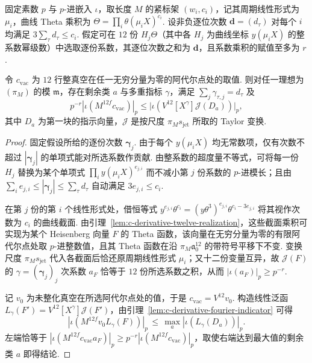 \begin{lemma}[曲线级数系数向剩余类指示向量的传递]
\label{lem:c-derivative-indicator}
\emitthmsource
固定素数 $p$ 与 $p$-进嵌入 $\iota$，取长度 $M$ 的紧标架 $(w_i,c_i)$，记其周期线性形式为 $\mu_i$，曲线 Theta 乘积为 $\Theta=\prod_i\theta(\mu_i X)^{c_i}$. 设非负逐位次数 $\boldsymbol d=(d_\tau)$ 对每个 $i$ 均满足 $3\sum_\tau d_\tau\le c_i$. 假定可在 $12$ 份 $H_j\Theta$（其中各 $H_j$ 为曲线坐标 $y(\mu_i X)$ 的整系数幂级数）中选取逐份系数，其逐位次数之和为 $\boldsymbol d$，且系数乘积的赋值至多为 $r$.

令 $c_{\mathrm{vac}}$ 为 $12$ 行整真空在任一无穷分量为零的阿代尔点处的取值. 则对任一理想为 $(\pi_M)$ 的模 $\mathfrak m$，存在剩余类 $a$ 与多重指标 $\gamma$，满足 $\sum_j\gamma_{\tau,j}=d_\tau$ 及
\[
  p^{-r}|\iota(M^{12f}c_{\mathrm{vac}})|_p
      \le \bigl|\iota(V^{12}[X^\gamma]\mathcal J(D_a))\bigr|_p ,
\]
其中 $D_a$ 为第一块的指示向量，$\mathcal J$ 是按尺度 $\pi_M s_{\mathrm{jet}}$ 所取的 Taylor 变换.
\end{lemma}

\begin{proof}
固定假设所给的逐份次数 $\boldsymbol\gamma_j$. 由于每个 $y(\mu_i X)$ 均无常数项，仅有次数不超过 $|\boldsymbol\gamma_j|$ 的单项式能对所选系数作贡献. 由整系数的超度量不等式，可将每一份 $H_j$ 替换为某个单项式 $\prod_i y(\mu_i X)^{e_{j,i}}$ 而不减小第 $j$ 份系数的 $p$-进模长；且由 $\sum_i e_{j,i}\le|\boldsymbol\gamma_j|\le\sum_\tau d_\tau$ 自动满足 $3e_{j,i}\le c_i$.

在第 $j$ 份的第 $i$ 个线性形式处，借恒等式 $y^{e_{j,i}}\theta^{c_i}=(y\theta^3)^{e_{j,i}}\theta^{c_i-3e_{j,i}}$ 将其视作次数为 $c_i$ 的曲线截面. 由引理~\ref{lem:c-derivative-twelve-realization}，这些截面乘积可实现为某个 Heisenberg 向量 $F$ 的 Theta 函数，该向量在无穷分量为零的有限阿代尔点处取 $p$-进整数值，且其 Theta 函数在沿 $\pi_M\mathfrak a_0^{12}$ 的带符号平移下不变. 变换尺度 $\pi_M s_{\mathrm{jet}}$ 代入各截面后恰还原周期线性形式 $\mu_i$；又十二份变量互异，故 $\mathcal J(F)$ 的 $\gamma=(\boldsymbol\gamma_j)_j$ 次系数 $a_F$ 恰等于 $12$ 份所选系数之积，从而 $|\iota(a_F)|_p\ge p^{-r}$.

记 $v_0$ 为未整化真空在所选阿代尔点处的值，于是 $c_{\mathrm{vac}}=V^{12}v_0$. 构造线性泛函 $L_\gamma(F')=V^{12}[X^\gamma]\mathcal J(F')$，由引理~\ref{lem:c-derivative-fourier-indicator} 可得
\[
 |\iota(M^{12f}v_0 L_\gamma(F))|_p
 \,\le\,\max_a|\iota(L_\gamma(D_a))|_p .
\]
左端恰等于 $|\iota(M^{12f} c_{\mathrm{vac}}a_F)|_p\ge p^{-r}|\iota(M^{12f}c_{\mathrm{vac}})|_p$，取使右端达到最大值的剩余类 $a$ 即得结论.
\end{proof}

